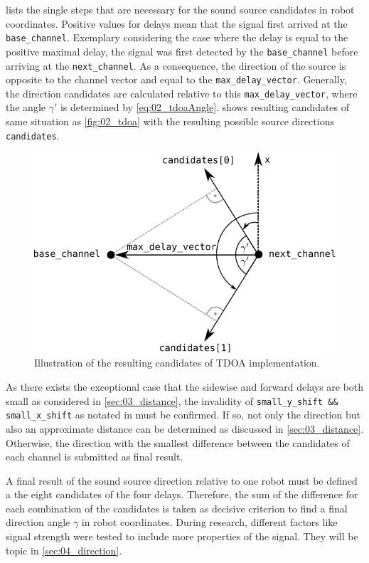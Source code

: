 lists the single steps that are necessary for the sound source
candidates in robot coordinates.
Positive values for delays mean that the signal first arrived at the \lstinline!base_channel!.
Exemplary considering the case where the delay is equal to the positive maximal delay,
the signal was first
detected by the \lstinline!base_channel! before arriving at the \lstinline!next_channel!.
As a consequence, the direction of the source is opposite to the channel vector and equal
to the \lstinline!max_delay_vector!.
Generally, the direction candidates are calculated relative to this \lstinline!max_delay_vector!,
where the angle $\gamma'$ is determined by \cref{eq:02_tdoaAngle}.
 shows resulting candidates of same situation as \cref{fig:02_tdoa} with
the resulting possible source directions \lstinline!candidates!.
\begin{figure}[ht]
	\centering
		\includegraphics[width=0.6\columnwidth]{figures/tdoa_code}
	\caption{Illustration of the resulting candidates of \ac{TDOA} implementation.}
	\label{fig:03_tdoaCode}
\end{figure}

As there exists the exceptional case that the sidewise and forward delays are both small
as considered in \cref{sec:03_distance}, the invalidity of
\lstinline!small_y_shift && small_x_shift! as notated in %
must be confirmed.
If so, not only the direction but also an approximate distance can be determined
as discussed in \cref{sec:03_distance}.
Otherwise, the direction with the smallest difference between the
candidates of each channel is submitted as final result.

A final result of the sound source direction relative to one robot must be defined
a the eight candidates of the four delays.
Therefore, the sum of the difference for each combination of the candidates
is taken as decisive criterion to find a final direction angle $\gamma$ in robot coordinates.
During research, different factors like signal strength were tested to include
more properties of the signal. They will be topic in \ref{sec:04_direction}.


